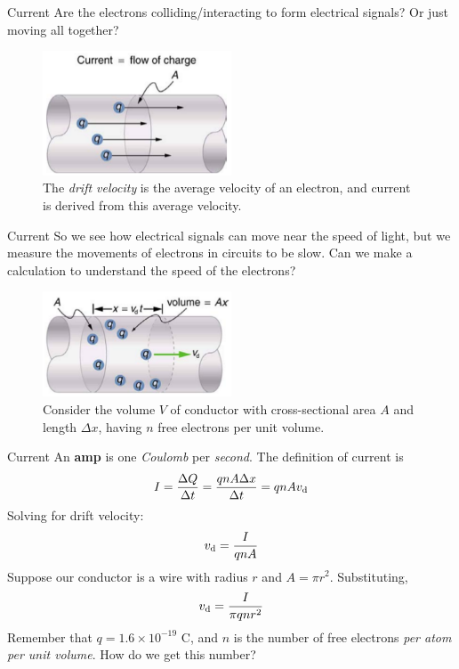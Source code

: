 \documentclass{beamer}
\begin{document}
\begin{frame}{Current}
\small
Are the electrons colliding/interacting to form electrical signals?  Or just moving all together?
\begin{figure}
\includegraphics[width=0.5\textwidth]{figures/current1.png}
\caption{\label{fig:current1} The \textit{drift velocity} is the average velocity of an electron, and current is derived from this average velocity.}
\end{figure}
\end{frame}

\begin{frame}{Current}
So we see how electrical signals can move near the speed of light, but we measure the movements of electrons in circuits to be slow.  Can we make a calculation to understand the speed of the electrons? \\ \vspace{0.5cm}
\begin{figure}
\includegraphics[width=0.5\textwidth]{figures/current3.png}
\caption{\label{fig:current3} Consider the volume $V$ of conductor with cross-sectional area $A$ and length $\Delta x$, having $n$ free electrons per unit volume.}
\end{figure}
\end{frame}

\begin{frame}{Current}
An \textbf{amp} is one \textit{Coulomb} per \textit{second}.  The definition of current is
\begin{equation}
I = \frac{\Delta Q}{\Delta t} = \frac{qnA\Delta x}{\Delta t} = q n A v_{\rm d}
\end{equation}
Solving for drift velocity:
\begin{equation}
v_{\rm d} = \frac{I}{q n A}
\end{equation}
Suppose our conductor is a wire with radius $r$ and $A = \pi r^2$.  Substituting,
\begin{equation}
v_{\rm d} = \frac{I}{\pi q n r^2}
\end{equation}
Remember that $q = 1.6 \times 10^{-19}$ C, and $n$ is the number of free electrons \textit{per atom per unit volume}.  How do we get this number?
\end{frame}
\end{document}
